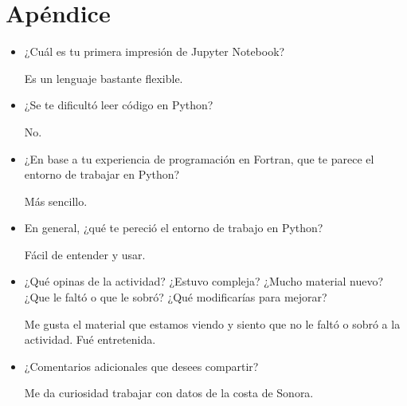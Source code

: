 \documentclass[12pt]{article}
\begin{document}
\section{Ap\'endice}
\begin{itemize}
\item ¿Cuál es tu primera impresión de Jupyter Notebook?

Es un lenguaje bastante flexible.
\item ¿Se te dificultó leer código en Python?

No.
\item ¿En base a tu experiencia de programación en Fortran, que te parece el entorno de trabajar en Python?

M\'as sencillo.
\item En general, ¿qué te pereció el entorno de trabajo en Python? 

F\'acil de entender y usar.
\item ¿Qué opinas de la actividad? ¿Estuvo compleja? ¿Mucho material nuevo? ¿Que le faltó o que le sobró? ¿Qué modificarías para mejorar? 

Me gusta el material que estamos viendo y siento que no le falt\'o o sobr\'o a la actividad. Fu\'e entretenida.
\item ¿Comentarios adicionales que desees compartir? 

Me da curiosidad trabajar con datos de la costa de Sonora. 
\end{itemize}
\end{document}
